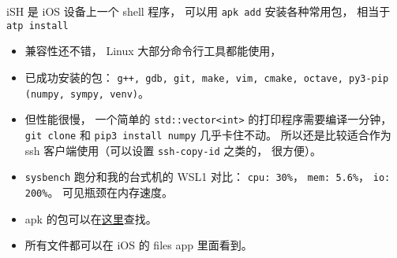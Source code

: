 

\begin{issues}
\issueDraft
\end{issues}

iSH 是 iOS 设备上一个 shell 程序， 可以用 \verb|apk add| 安装各种常用包， 相当于 \verb|atp install|

\begin{itemize}
\item 兼容性还不错， Linux 大部分命令行工具都能使用，
\item 已成功安装的包： \verb|g++, gdb, git, make, vim, cmake, octave, py3-pip (numpy, sympy, venv)|。
\item 但性能很慢， 一个简单的 \verb|std::vector<int>| 的打印程序需要编译一分钟， \verb|git clone| 和 \verb|pip3 install numpy| 几乎卡住不动。 所以还是比较适合作为 ssh 客户端使用（可以设置 \verb|ssh-copy-id| 之类的， 很方便）。
\item \verb|sysbench| 跑分和我的台式机的 WSL1 对比： \verb|cpu: 30%|， \verb|mem: 5.6%|， \verb|io: 200%|。 可见瓶颈在内存速度。
\item apk 的包可以在\href{https://pkgs.alpinelinux.org/}{这里}查找。
\item 所有文件都可以在 iOS 的 files app 里面看到。
\end{itemize}
